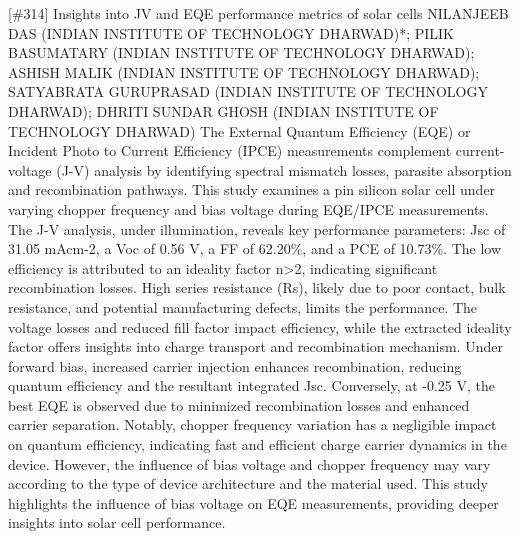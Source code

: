 {} \begin{abstract_online} {[\#314] Insights into JV and EQE performance metrics of solar cells} {} {NILANJEEB DAS (INDIAN INSTITUTE OF TECHNOLOGY DHARWAD)*; PILIK BASUMATARY (INDIAN INSTITUTE OF TECHNOLOGY DHARWAD); ASHISH MALIK (INDIAN INSTITUTE OF TECHNOLOGY DHARWAD); SATYABRATA GURUPRASAD (INDIAN INSTITUTE OF TECHNOLOGY DHARWAD); DHRITI SUNDAR GHOSH (INDIAN INSTITUTE OF TECHNOLOGY DHARWAD)} {} The External Quantum Efficiency (EQE) or Incident Photo to Current Efficiency (IPCE) measurements complement current-voltage (J-V) analysis by identifying spectral mismatch losses, parasite absorption and recombination pathways. This study examines a pin silicon solar cell under varying chopper frequency and bias voltage during EQE/IPCE measurements. The J-V analysis, under illumination, reveals key performance parameters:   Jsc of 31.05 mAcm-2, a Voc of 0.56 V, a FF of 62.20\%, and a PCE of 10.73\%. The low efficiency is attributed to an ideality factor n>2, indicating significant recombination losses. High series resistance (Rs), likely due to poor contact, bulk resistance, and potential manufacturing defects, limits the performance. The voltage losses and reduced fill factor impact efficiency, while the extracted ideality factor offers insights into charge transport and recombination mechanism. Under forward bias, increased carrier injection enhances recombination, reducing quantum efficiency and the resultant integrated Jsc. Conversely, at -0.25 V, the best EQE is observed due to minimized recombination losses and enhanced carrier separation. Notably, chopper frequency variation has a negligible impact on quantum efficiency, indicating fast and efficient charge carrier dynamics in the device. However, the influence of bias voltage and chopper frequency may vary according to the type of device architecture and the material used. This study highlights the influence of bias voltage on EQE measurements, providing deeper insights into solar cell performance.     \end{abstract_online} 
